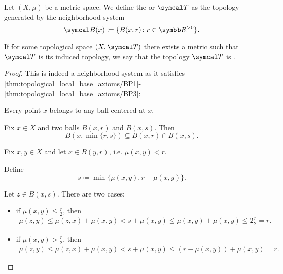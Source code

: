 \begin{definition}\label{def:metric_topology}\cite[249]{Engelking1989}
  Let \( (X, \mu) \) be a metric space. We define the  or  \( \Cal{T} \) as the topology generated by the neighborhood system
  \begin{equation*}
    \Cal{B}(x) \coloneqq \{ B (x, r) \colon r \in \R^{>0} \}.
  \end{equation*}

  If for some topological space \( (X, \Cal{T}) \) there exists a metric such that \( \Cal{T} \) is its induced topology, we say that the topology \( \Cal{T} \) is .
\end{definition}
\begin{proof}
  This is indeed a neighborhood system as it satisfies \ref{thm:topological_local_base_axioms/BP1}-\ref{thm:topological_local_base_axioms/BP3}:

  \begin{description}
     Every point \( x \) belongs to any ball centered at \( x \).

     Fix \( x \in X \) and two balls \( B(x, r) \) and \( B(x, s) \). Then
    \begin{equation*}
      B(x, \min\{ r, s \}) \subseteq B(x, r) \cap B(x, s).
    \end{equation*}

     Fix \( x, y \in X \) and let \( x \in B(y, r) \), i.e. \( \mu(x, y) < r \).

    Define
    \begin{equation*}
      s \coloneqq \min\{ \mu(x, y), r - \mu(x, y) \}.
    \end{equation*}

    Let \( z \in B(x, s) \). There are two cases:
    \begin{itemize}
      \item if \( \mu(x, y) \leq \tfrac r 2 \), then
      \begin{align*}
        \mu(z, y)
        \leq
        \mu(z, x) + \mu(x, y)
        <
        s + \mu(x, y)
        \leq
        \mu(x, y) + \mu(x, y)
        \leq
        2 \tfrac r 2
        =
        r.
      \end{align*}

      \item if \( \mu(x, y) > \tfrac r 2 \), then
      \begin{align*}
        \mu(z, y)
        \leq
        \mu(z, x) + \mu(x, y)
        <
        s + \mu(x, y)
        \leq
        (r - \mu(x, y)) + \mu(x, y)
        =
        r.
      \end{align*}
    \end{itemize}


\end{description}
\end{proof}
